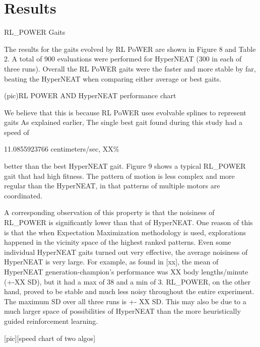 \section{Results}

RL\_POWER Gaits

The results for the gaits evolved by RL PoWER are shown in Figure 8
and Table 2. A total of 900 evaluations were performed for HyperNEAT
(300 in each of three runs). Overall the RL PoWER gaits were the
faster and more stable by far, beating the HyperNEAT when comparing
either average or best gaits.

(pic)RL POWER AND HyperNEAT performance chart


We believe that this is because RL PoWER uses evolvable splines to represent gaits As explained earlier,  
The single best gait found during this study had a speed of

11.0855923766 centimeters/sec, XX\%

better than the best HyperNEAT gait. Figure 9 shows a typical
RL\_POWER gait that had high fitness. The pattern of motion is less
complex and more regular than the HyperNEAT, in that patterns of
multiple motors are coordinated.

A corresponding observation of this property is that the noisiness of
RL\_POWER is significantly lower than that of HyperNEAT. One reason of
this is that the when Expectation Maximization methodology is used,
explorations happened in the vicinity space of the highest ranked
patterns. Even some individual HyperNEAT gaits turned out very
effective, the average noisiness of HyperNEAT is very large. For
example, as found in [xx], the mean of HyperNEAT generation-champion’s
performance was XX body lengths/minute (+-XX SD), but it had a max of
38 and a min of 3. RL\_POWER, on the other hand, proved to be stable
and much less noisy throughout the entire experiment. The maximum SD
over all three runs is +- XX SD. This may also be due to a much larger
space of possibilities of HyperNEAT than the more heuristically guided
reinforcement learning.

[pic][speed chart of two algos]


